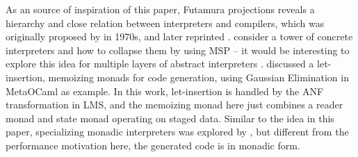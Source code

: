 As an source of inspiration of this paper, Futamura projections
reveals a hierarchy and close relation between interpreters and
compilers, which was originally proposed by
\citeauthor{futamura1971partial} in 1970s\cite{futamura1971partial},
and later reprinted \cite{Futamura1999}.
\citeauthor{Amin:2017:CTI:3177123.3158140} consider a tower of
concrete interpreters and how to collapse them by using MSP -- it
would be interesting to explore this idea for multiple layers of
abstract interpreters \cite{Cousot:2019:AAI:3302515.3290355,
  Giacobazzi:2015:APA:2676726.2676987}.  \citet{10.1007/11561347_18}
discussed a let-insertion, memoizing monads for code generation, using
Gaussian Elimination in MetaOCaml as example. In this work,
let-insertion is handled by the ANF transformation in LMS, and the
memoizing monad here just combines a reader monad and state monad
operating on staged data.
Similar to the idea in this paper, specializing monadic interpreters
was explored by \citet{danvy1991compiling, DBLP:conf/dsl/SheardBP99},
but different from the performance motivation here, the generated code
is in monadic form.
